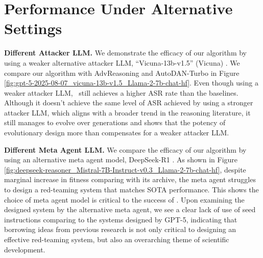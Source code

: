 \clearpage

\section{Performance Under Alternative Settings}
\label{appx: performance under alternative settings}

\textbf{Different Attacker LLM.} \label{appx: vicuna attacker} We demonstrate the efficacy of our algorithm by using a weaker alternative attacker LLM, “Vicuna-13b-v1.5” (Vicuna) \citep{vicuna2023}. We compare our algorithm with AdvReasoning and AutoDAN-Turbo in Figure \ref{fig:gpt-5-2025-08-07_vicuna-13b-v1.5_Llama-2-7b-chat-hf}. Even though using a weaker attacker LLM, \method~still achieves a higher ASR rate than the baselines. Although it doesn't achieve the same level of ASR achieved by using a stronger attacker LLM, which aligns with a broader trend in the reasoning literature, it still manages to evolve over generations and shows that the potency of evolutionary design more than compensates for a weaker attacker LLM.

\textbf{Different Meta Agent LLM.}
\label{appx: deepseek meta agent} We compare the efficacy of our algorithm by using an alternative meta agent model, DeepSeek-R1 \citep{deepseekai2025deepseekr1incentivizingreasoningcapability}. As shown in Figure \ref{fig:deepseek-reasoner_Mistral-7B-Instruct-v0.3_Llama-2-7b-chat-hf}, despite marginal increase in fitness comparing with its archive, the meta agent struggles to design a red-teaming system that matches SOTA performance. This shows the choice of meta agent model is critical to the success of \method. Upon examining the designed system by the alternative meta agent, we see a clear lack of use of seed instructions comparing to the systems designed by GPT-5, indicating that borrowing ideas from previous research is not only critical to designing an effective red-teaming system, but also an overarching theme of scientific development.

